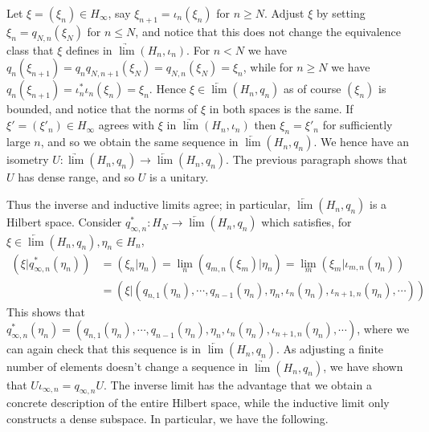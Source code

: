 \documentclass[twoside,a4paper,12pt]{article}
\theoremstyle{plain}
\theoremstyle{definition}
\begin{document}
Let $\xi=(\xi_n) \in H_\infty$, say $\xi_{n+1} = \iota_n(\xi_n)$ for $n\geq N$.  Adjust $\xi$ by setting $\xi_n = q_{N,n}(\xi_N)$ for $n\leq N$, and notice that this does not change the equivalence class that $\xi$ defines in $\underrightarrow{\lim} (H_n, \iota_n)$.  For $n<N$ we have $q_n(\xi_{n+1}) = q_n q_{N,n+1}(\xi_N) = q_{N,n}(\xi_N) = \xi_n$, while for $n\geq N$ we have $q_n(\xi_{n+1}) = \iota_n^* \iota_n(\xi_n) = \xi_n$.  Hence $\xi \in \underleftarrow{\lim} (H_n, q_n)$ as of course $(\xi_n)$ is bounded, and notice that the norms of $\xi$ in both spaces is the same.  If $\xi'=(\xi'_n)\in H_\infty$ agrees with $\xi$ in $\underrightarrow{\lim} (H_n, \iota_n)$ then $\xi_n = \xi'_n$ for sufficiently large $n$, and so we obtain the same sequence in $\underleftarrow{\lim} (H_n, q_n)$.  We hence have an isometry $U \colon \underrightarrow{\lim} (H_n, q_n) \to \underleftarrow{\lim} (H_n, q_n)$.  The previous paragraph shows that $U$ has dense range, and so $U$ is a unitary.

Thus the inverse and inductive limits agree; in particular, $\underleftarrow{\lim} (H_n, q_n)$ is a Hilbert space.  Consider $q_{\infty,n}^* \colon H_N \to \underleftarrow{\lim} (H_n, q_n)$ which satisfies, for $\xi\in \underleftarrow{\lim} (H_n, q_n), \eta_n\in H_n$,
\begin{align*}
(\xi|q_{\infty,n}^*(\eta_n))
&= (\xi_n|\eta_n)
= \lim_n (q_{m,n}(\xi_m)|\eta_n)
= \lim_m (\xi_m | \iota_{m,n}(\eta_n)) \\
&= (\xi|(q_{n,1}(\eta_n),\cdots,q_{n-1}(\eta_n),\eta_n, \iota_n(\eta_n), \iota_{n+1,n}(\eta_n), \cdots))
\end{align*}
This shows that $q_{\infty,n}^*(\eta_n) = (q_{n,1}(\eta_n),\cdots,q_{n-1}(\eta_n),\eta_n, \iota_n(\eta_n), \iota_{n+1,n}(\eta_n), \cdots)$, where we can again check that this sequence is in $\underleftarrow{\lim} (H_n, q_n)$.  As adjusting a finite number of elements doesn't change a sequence in $\underrightarrow{\lim} (H_n, q_n)$, we have shown that $U \iota_{\infty, n} = q_{\infty, n} U$.  The inverse limit has the advantage that we obtain a concrete description of the entire Hilbert space, while the inductive limit only constructs a dense subspace.  In particular, we have the following.
\end{document}
